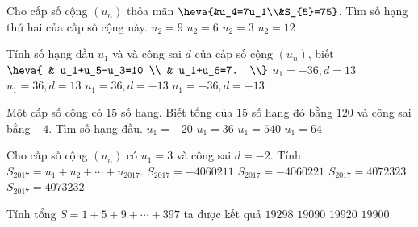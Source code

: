 \begin{ex}%
	Cho cấp số cộng $(u_n)$ thỏa mãn $\heva{&u_4=7u_1\\&S_{5}=75}$. Tìm số hạng thứ hai của cấp số cộng này.
	\choice
	{\True $u_2=9$}
	{$u_2=6$}
	{$ u_2=3$}
	{$ u_2=12$}
\end{ex}



\begin{ex}%
	Tính số hạng đầu $u_1$ và và công sai $d$ của cấp số cộng $\left(u_n\right)$, biết $\heva{
		& u_1+u_5-u_3=10 \\ 
		& u_1+u_6=7. \\}$
	\choice
	{$u_1=-36, d=13$}
	{$u_1=36, d=13$}
	{\True $u_1=36, d=-13$}
	{$u_1=-36, d=-13$}
\end{ex}

\begin{ex}%
	Một cấp số cộng có $15$ số hạng. Biết tổng của $15$ số hạng đó bằng $120$ và công sai bằng $-4$. Tìm số hạng đầu.
	\choice
	{$u_1=-20$}
	{\True $u_1=36$}
	{$u_1=540$}
	{$u_1=64$}
\end{ex}

\begin{ex}%
	Cho cấp số cộng $(u_n)$ có $u_1=3$ và công sai $d=-2$. Tính $S_{2017}=u_1+u_2+\cdots +u_{2017}$.
	\choice
	{$S_{2017}=-4060211$}
	{\True $S_{2017}=-4060221$}
	{$S_{2017}=4072323$}
	{$S_{2017}=4073232$}
\end{ex}

\begin{ex}%
	Tính tổng $S=1+5+9+\cdots+397$ ta được kết quả
	\choice
	{$19298$}
	{$19090$}
	{$19920$}
	{\True $19900$}
\end{ex}

